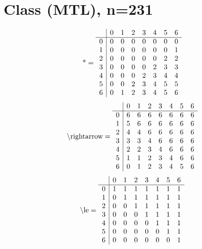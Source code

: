 \documentclass[11pt]{article}
\begin{document}
\section{Class (MTL), n=231}
\[\text{*} = 
\begin{array}{r | r r r r r r r}
 & 0 & 1 & 2 & 3 & 4 & 5 & 6 \\ \hline
0 & 0 & 0 & 0 & 0 & 0 & 0 & 0 \\
1 & 0 & 0 & 0 & 0 & 0 & 0 & 1 \\
2 & 0 & 0 & 0 & 0 & 0 & 2 & 2 \\
3 & 0 & 0 & 0 & 0 & 2 & 3 & 3 \\
4 & 0 & 0 & 0 & 2 & 3 & 4 & 4 \\
5 & 0 & 0 & 2 & 3 & 4 & 5 & 5 \\
6 & 0 & 1 & 2 & 3 & 4 & 5 & 6 \\
\end{array}
\]
\[\text{\textbackslash rightarrow} = 
\begin{array}{r | r r r r r r r}
 & 0 & 1 & 2 & 3 & 4 & 5 & 6 \\ \hline
0 & 6 & 6 & 6 & 6 & 6 & 6 & 6 \\
1 & 5 & 6 & 6 & 6 & 6 & 6 & 6 \\
2 & 4 & 4 & 6 & 6 & 6 & 6 & 6 \\
3 & 3 & 3 & 4 & 6 & 6 & 6 & 6 \\
4 & 2 & 2 & 3 & 4 & 6 & 6 & 6 \\
5 & 1 & 1 & 2 & 3 & 4 & 6 & 6 \\
6 & 0 & 1 & 2 & 3 & 4 & 5 & 6 \\
\end{array}
\]
\[\text{\textbackslash le} = 
\begin{array}{r | r r r r r r r}
 & 0 & 1 & 2 & 3 & 4 & 5 & 6 \\ \hline
0 & 1 & 1 & 1 & 1 & 1 & 1 & 1 \\
1 & 0 & 1 & 1 & 1 & 1 & 1 & 1 \\
2 & 0 & 0 & 1 & 1 & 1 & 1 & 1 \\
3 & 0 & 0 & 0 & 1 & 1 & 1 & 1 \\
4 & 0 & 0 & 0 & 0 & 1 & 1 & 1 \\
5 & 0 & 0 & 0 & 0 & 0 & 1 & 1 \\
6 & 0 & 0 & 0 & 0 & 0 & 0 & 1 \\
\end{array}
\]
\end{document}
